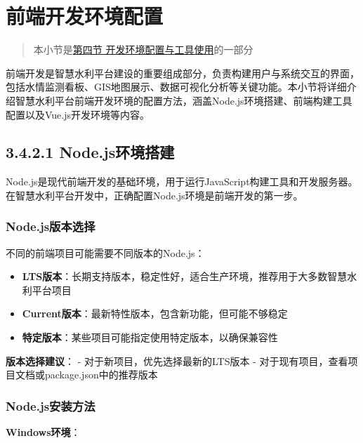 \section{前端开发环境配置}\label{ux524dux7aefux5f00ux53d1ux73afux5883ux914dux7f6e}

\begin{quote}
本小节是\href{section03-04.md}{第四节 开发环境配置与工具使用}的一部分
\end{quote}

前端开发是智慧水利平台建设的重要组成部分，负责构建用户与系统交互的界面，包括水情监测看板、GIS地图展示、数据可视化分析等关键功能。本小节将详细介绍智慧水利平台前端开发环境的配置方法，涵盖Node.js环境搭建、前端构建工具配置以及Vue.js开发环境等内容。

\subsection{3.4.2.1
Node.js环境搭建}\label{node.jsux73afux5883ux642dux5efa}

Node.js是现代前端开发的基础环境，用于运行JavaScript构建工具和开发服务器。在智慧水利平台开发中，正确配置Node.js环境是前端开发的第一步。

\subsubsection{Node.js版本选择}\label{node.jsux7248ux672cux9009ux62e9}

不同的前端项目可能需要不同版本的Node.js：

\begin{itemize}
\tightlist
\item
  \textbf{LTS版本}：长期支持版本，稳定性好，适合生产环境，推荐用于大多数智慧水利平台项目
\item
  \textbf{Current版本}：最新特性版本，包含新功能，但可能不够稳定
\item
  \textbf{特定版本}：某些项目可能指定使用特定版本，以确保兼容性
\end{itemize}

\textbf{版本选择建议}： - 对于新项目，优先选择最新的LTS版本 -
对于现有项目，查看项目文档或package.json中的推荐版本

\subsubsection{Node.js安装方法}\label{node.jsux5b89ux88c5ux65b9ux6cd5}

\textbf{Windows环境}：

